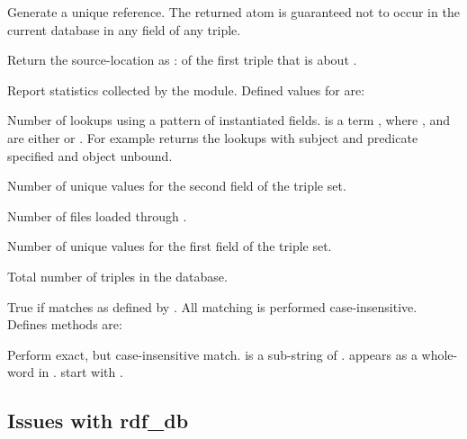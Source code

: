 \documentclass[11pt]{article}
\begin{document}
\begin{description}
Generate a unique reference.  The returned atom is guaranteed not to
occur in the current database in any field of any triple.

Return the source-location as : of the first triple
that is about .

Report statistics collected by the  module.  Defined
values for  are:

    \begin{description}
Number of lookups using a pattern of instantiated fields.  
is a term , where ,  and  are
either \const{+} or \const{-}.  For example  returns
the lookups with subject and predicate specified and object unbound.

Number of unique values for the second field of the triple set.

Number of files loaded through .

Number of unique values for the first field of the triple set.

Total number of triples in the database.
        \end{description}

True if  matches  as defined by .
All matching is performed case-insensitive.  Defines methods are:
    \begin{description}
    	    Perform exact, but case-insensitive match.
	     is a sub-string of .
	     appears as a whole-word in .
	     start with .
    \end{description}
\end{description}


\subsection{Issues with rdf_db}				\label{sec:rdfissues}
\end{document}
